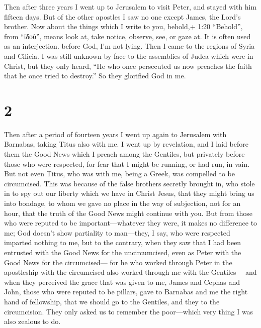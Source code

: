  Then after three years I went up to Jerusalem to visit
Peter, and stayed with him fifteen days.  But of the other
apostles I saw no one except James, the Lord's brother. 
Now about the things which I write to you, behold,+ 1:20 ``Behold'',
from ``ἰδοὺ'', means look at, take notice, observe, see, or gaze at. It
is often used as an interjection. before God, I'm not lying.
 Then I came to the regions of Syria and Cilicia.
 I was still unknown by face to the assemblies of Judea
which were in Christ,  but they only heard, ``He who once
persecuted us now preaches the faith that he once tried to destroy.''
 So they glorified God in me.

\hypertarget{section-1}{%
\section{2}\label{section-1}}

 Then after a period of fourteen years I went up again to
Jerusalem with Barnabas, taking Titus also with me.  I went
up by revelation, and I laid before them the Good News which I preach
among the Gentiles, but privately before those who were respected, for
fear that I might be running, or had run, in vain.  But not
even Titus, who was with me, being a Greek, was compelled to be
circumcised.  This was because of the false brothers
secretly brought in, who stole in to spy out our liberty which we have
in Christ Jesus, that they might bring us into bondage,  to
whom we gave no place in the way of subjection, not for an hour, that
the truth of the Good News might continue with you.  But
from those who were reputed to be important---whatever they were, it
makes no difference to me; God doesn't show partiality to man---they, I
say, who were respected imparted nothing to me,  but to the
contrary, when they saw that I had been entrusted with the Good News for
the uncircumcised, even as Peter with the Good News for the
circumcised---  for he who worked through Peter in the
apostleship with the circumcised also worked through me with the
Gentiles---  and when they perceived the grace that was
given to me, James and Cephas and John, those who were reputed to be
pillars, gave to Barnabas and me the right hand of fellowship, that we
should go to the Gentiles, and they to the circumcision. 
They only asked us to remember the poor---which very thing I was also
zealous to do.


